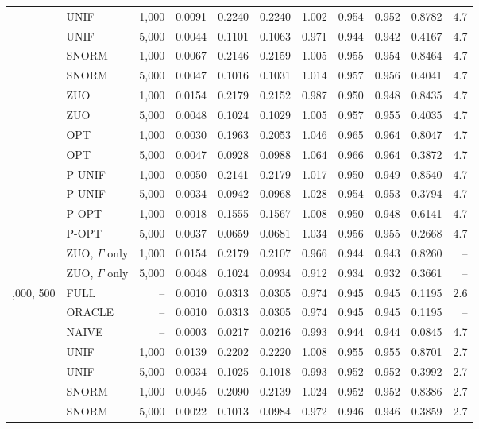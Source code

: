 \begin{tabular}{llrrrrrrrrr}
 & UNIF & 1,000 & 0.0091 & 0.2240 & 0.2240 & 1.002 & 0.954 & 0.952 & 0.8782 & 4.7\\
 & UNIF & 5,000 & 0.0044 & 0.1101 & 0.1063 & 0.971 & 0.944 & 0.942 & 0.4167 & 4.7\\
 & SNORM & 1,000 & 0.0067 & 0.2146 & 0.2159 & 1.005 & 0.955 & 0.954 & 0.8464 & 4.7\\
 & SNORM & 5,000 & 0.0047 & 0.1016 & 0.1031 & 1.014 & 0.957 & 0.956 & 0.4041 & 4.7\\
 & ZUO & 1,000 & 0.0154 & 0.2179 & 0.2152 & 0.987 & 0.950 & 0.948 & 0.8435 & 4.7\\
 & ZUO & 5,000 & 0.0048 & 0.1024 & 0.1029 & 1.005 & 0.957 & 0.955 & 0.4035 & 4.7\\
 & OPT & 1,000 & 0.0030 & 0.1963 & 0.2053 & 1.046 & 0.965 & 0.964 & 0.8047 & 4.7\\
 & OPT & 5,000 & 0.0047 & 0.0928 & 0.0988 & 1.064 & 0.966 & 0.964 & 0.3872 & 4.7\\
 & P-UNIF & 1,000 & 0.0050 & 0.2141 & 0.2179 & 1.017 & 0.950 & 0.949 & 0.8540 & 4.7\\
 & P-UNIF & 5,000 & 0.0034 & 0.0942 & 0.0968 & 1.028 & 0.954 & 0.953 & 0.3794 & 4.7\\
 & P-OPT & 1,000 & 0.0018 & 0.1555 & 0.1567 & 1.008 & 0.950 & 0.948 & 0.6141 & 4.7\\
 & P-OPT & 5,000 & 0.0037 & 0.0659 & 0.0681 & 1.034 & 0.956 & 0.955 & 0.2668 & 4.7\\
 & ZUO, \(\Gamma\) only & 1,000 & 0.0154 & 0.2179 & 0.2107 & 0.966 & 0.944 & 0.943 & 0.8260 & --\\
 & ZUO, \(\Gamma\) only & 5,000 & 0.0048 & 0.1024 & 0.0934 & 0.912 & 0.934 & 0.932 & 0.3661 & --\\
\addlinespace
100,000, 500 & FULL & -- & 0.0010 & 0.0313 & 0.0305 & 0.974 & 0.945 & 0.945 & 0.1195 & 2.6\\
 & ORACLE & -- & 0.0010 & 0.0313 & 0.0305 & 0.974 & 0.945 & 0.945 & 0.1195 & --\\
 & NAIVE & -- & 0.0003 & 0.0217 & 0.0216 & 0.993 & 0.944 & 0.944 & 0.0845 & 4.7\\
 & UNIF & 1,000 & 0.0139 & 0.2202 & 0.2220 & 1.008 & 0.955 & 0.955 & 0.8701 & 2.7\\
 & UNIF & 5,000 & 0.0034 & 0.1025 & 0.1018 & 0.993 & 0.952 & 0.952 & 0.3992 & 2.7\\
 & SNORM & 1,000 & 0.0045 & 0.2090 & 0.2139 & 1.024 & 0.952 & 0.952 & 0.8386 & 2.7\\
 & SNORM & 5,000 & 0.0022 & 0.1013 & 0.0984 & 0.972 & 0.946 & 0.946 & 0.3859 & 2.7\\

\end{tabular}
